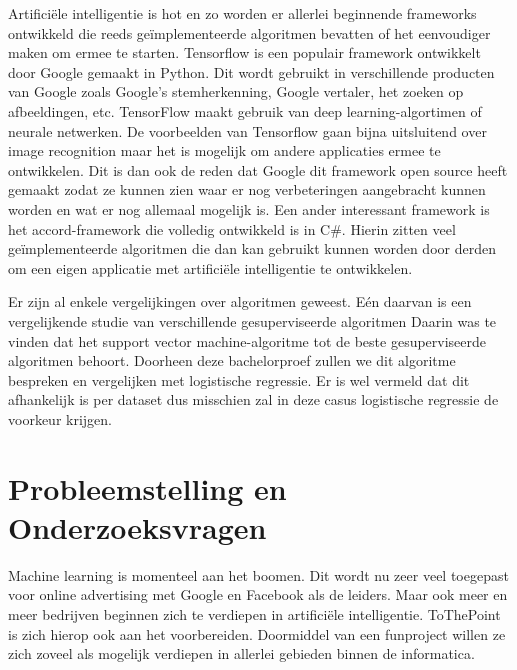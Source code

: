 Artificiële intelligentie is hot en zo worden er allerlei beginnende frameworks ontwikkeld die reeds geïmplementeerde algoritmen bevatten of het eenvoudiger maken om ermee te starten. 
Tensorflow is een populair framework ontwikkelt door Google gemaakt in Python. Dit wordt gebruikt in verschillende producten van Google zoals Google's stemherkenning, Google vertaler, het zoeken op afbeeldingen, etc.
TensorFlow maakt gebruik van deep learning-algortimen of neurale netwerken. De voorbeelden van Tensorflow gaan bijna uitsluitend over image recognition maar het is mogelijk om andere applicaties ermee te ontwikkelen. Dit is dan ook de reden dat Google dit framework open source heeft gemaakt zodat ze kunnen zien waar er nog verbeteringen aangebracht kunnen worden en wat er nog allemaal mogelijk is. \autocite{GooglesTensorflow}
Een ander interessant framework is het accord-framework \autocite{accord} die volledig ontwikkeld is in C\#. Hierin zitten veel geïmplementeerde algoritmen die dan kan gebruikt kunnen worden door derden om een eigen applicatie met artificiële intelligentie te ontwikkelen. 

Er zijn al enkele vergelijkingen over algoritmen geweest. Eén daarvan is een vergelijkende studie van verschillende gesuperviseerde algoritmen \autocite{vergelijkingSupervised} Daarin was te vinden dat het support vector machine-algoritme tot de beste gesuperviseerde algoritmen behoort. Doorheen deze bachelorproef zullen we dit algoritme bespreken en vergelijken met logistische regressie. Er is wel vermeld dat dit afhankelijk is per dataset dus misschien zal in deze casus logistische regressie de voorkeur krijgen.

\section{Probleemstelling en Onderzoeksvragen}
\label{sec:onderzoeksvragen}


Machine learning is momenteel aan het boomen. Dit wordt nu zeer veel toegepast voor online advertising met Google en Facebook als de leiders. Maar ook meer en meer bedrijven beginnen zich te verdiepen in artificiële intelligentie. ToThePoint is zich hierop ook aan het voorbereiden. Doormiddel van een funproject willen ze  zich zoveel als mogelijk verdiepen in allerlei gebieden binnen de informatica. 

